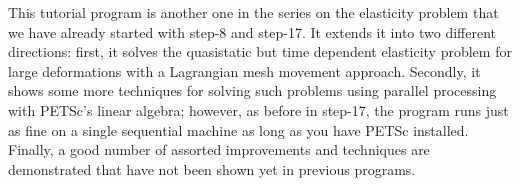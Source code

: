 \documentclass{article}
\begin{document}
This tutorial program is another one in the series on the elasticity problem
that we have already started with step-8 and step-17. It extends it into
two different directions: first, it solves the quasistatic but time
dependent elasticity problem for large deformations with a Lagrangian mesh
movement approach. Secondly, it shows some more techniques for solving such
problems using parallel processing with PETSc's linear algebra; however, as
before in step-17, the program runs just as fine on a single sequential
machine as long as you have PETSc installed. Finally, a good number of
assorted improvements and techniques are demonstrated that have not been shown
yet in previous programs.
\end{document}
